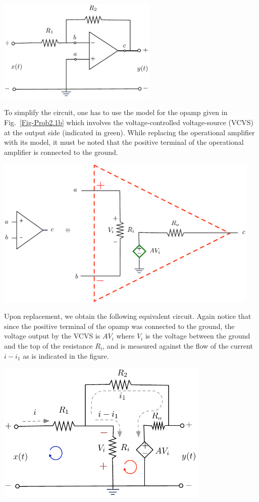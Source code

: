 \begin{excersizelist}
\begin{solution}
{
\centering
\captionsetup{type=figure}
\includegraphics[width=3in]{plots/multiplierbadri1.pdf}
 \label{Fig-Prob2.1a}
}

To simplify the circuit, one has to use the model for the opamp given in Fig.~\ref{Fig-Prob2.1b} which involves the voltage-controlled voltage-source (VCVS) at the output side (indicated in green).  While replacing the operational amplifier with its model, it must be noted that the positive terminal of the operational amplifier is connected to the ground.

{
\centering 
\captionsetup{type=figure}
\includegraphics[width=5in]{plots/multiplierbadri2.pdf}
 \label{Fig-Prob2.1b}
}

Upon replacement, we obtain the following equivalent circuit. Again notice that since the positive terminal of the opamp was connected to the ground, the voltage output by the VCVS is $AV_i$ where $V_i$ is the voltage between the ground and the top of the resistance $R_i$, and is measured against the flow of the current $i-i_1$ as is indicated in the figure.

{
\centering 
\captionsetup{type=figure}
\includegraphics[width=4in]{plots/multiplierbadri3.pdf}
 \label{Fig-Prob2.1c}
}


\end{solution}
\end{excersizelist}
